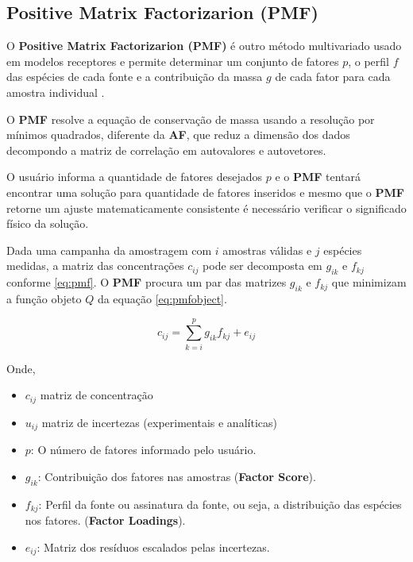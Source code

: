 

\subsection{Positive Matrix Factorizarion (\textbf{PMF})}

O \textbf{Positive Matrix Factorizarion (PMF)} é outro método multivariado usado
em modelos receptores e permite determinar um conjunto de fatores $p$, 
o perfil $f$ das espécies de cada fonte e a contribuição da massa $g$ de cada fator 
para cada amostra individual \citep{norris2014}. 

O \textbf{PMF} resolve a equação de conservação de massa usando a resolução por 
mínimos quadrados, diferente da \textbf{AF}, que reduz a dimensão dos 
dados decompondo a matriz de correlação em autovalores e autovetores. 

O usuário informa a quantidade de fatores desejados $p$ e o \textbf{PMF} 
tentará encontrar uma solução para quantidade de fatores inseridos e 
mesmo que o \textbf{PMF} retorne um ajuste matematicamente consistente 
é necessário verificar o significado físico da solução.

Dada uma campanha da amostragem com $i$ amostras válidas e 
$j$ espécies medidas, a matriz das concentrações $c_{ij}$ 
pode ser decomposta em $g_{ik}$ e $f_{kj}$ conforme \ref{eq:pmf}. 
O \textbf{PMF} procura um par das matrizes $g_{ik}$ e $f_{kj}$ que
minimizam a função objeto $Q$ da equação \ref{eq:pmfobject}. 

\begin{equation}
  c_{ij} = \sum_{k=i}^p g_{ik}f_{kj} + e_{ij}
  \label{eq:pmf}
\end{equation}

Onde,
\begin{itemize}
  \item $c_{ij}$ matriz de concentração
  \item $u_{ij}$ matriz de incertezas (experimentais e analíticas)
  \item $p$: O número de fatores informado pelo usuário.
  \item $g_{ik}$: Contribuição dos fatores nas amostras (\textbf{Factor Score}).
  \item $f_{kj}$: Perfil da fonte ou assinatura da fonte, ou seja, 
        a distribuição das espécies nos fatores. (\textbf{Factor Loadings}).
  \item $e_{ij}$: Matriz dos resíduos escalados pelas incertezas.
\end{itemize}

